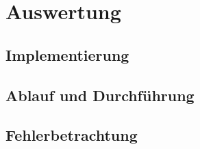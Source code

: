 \chapter{Auswertung}

\section{Implementierung}
\section{Ablauf und Durchführung}
\section{Fehlerbetrachtung}
